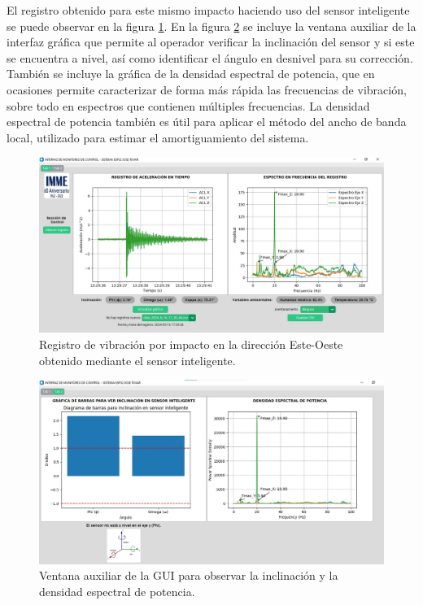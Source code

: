 El registro obtenido para este mismo impacto haciendo uso del sensor inteligente se puede observar en la figura \ref{fig:impactoGUI}. En la figura \ref{fig:ventana2} se incluye la ventana auxiliar de la interfaz gráfica que permite al operador verificar la inclinación del sensor y si este se encuentra a nivel, así como identificar el ángulo en desnivel para su corrección. También se incluye la gráfica de la densidad espectral de potencia, que en ocasiones permite caracterizar de forma más rápida las frecuencias de vibración, sobre todo en espectros que contienen múltiples frecuencias. La densidad espectral de potencia también es útil para aplicar el método del ancho de banda local, utilizado para estimar el amortiguamiento del sistema.

\begin{figure}[H]
    \centering
    \includegraphics[width = \textwidth]{imagenes/cap3_resultados/Ensayos/VibHammer6EsteOesteSMARTSENSOR.jpg}
    \caption{Registro de vibración por impacto en la dirección Este-Oeste obtenido mediante el sensor inteligente.}
    \label{fig:impactoGUI}
\end{figure}

\begin{figure}[H]
    \centering
    \includegraphics[width = \textwidth]{imagenes/cap3_resultados/Ensayos/VibHammer1NorteSurSMARTSENSORVentana2.jpg}
    \caption{Ventana auxiliar de la GUI para observar la inclinación y la densidad espectral de potencia.}
    \label{fig:ventana2}
\end{figure}

